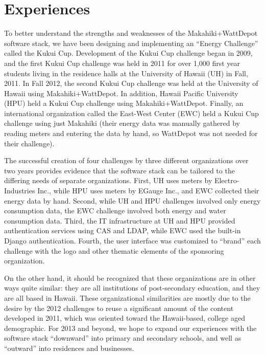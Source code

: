 \newpage
\section{Experiences}

To better understand the strengths and weaknesses of the Makahiki+WattDepot software stack, we have been designing and implementing an ``Energy Challenge'' called the Kukui Cup.  Development of the Kukui Cup challenge began in 2009, and the first Kukui Cup challenge was held in 2011 for over 1,000 first year students living in the residence halls at the University of Hawaii (UH) in Fall, 2011.  In Fall 2012, the second Kukui Cup challenge was held at the University of Hawaii using Makahiki+WattDepot.  In addition, Hawaii Pacific University (HPU) held a Kukui Cup challenge using Makahiki+WattDepot. Finally, an international organization called the East-West Center (EWC) held a Kukui Cup challenge using just Makahiki (their energy data was manually gathered by reading meters and entering the data by hand, so WattDepot was not needed for their challenge).    

The successful creation of four challenges by three different organizations over two years provides evidence that the software stack can be tailored to the differing needs of separate organizations.  First, UH uses meters by Electro-Industries Inc., while HPU uses meters by EGauge Inc., and EWC collected their energy data by hand. Second, while UH and HPU challenges involved only energy consumption data, the EWC challenge involved both energy and water consumption data.  Third, the IT infrastructure at UH and HPU provided authentication services using CAS and LDAP, while EWC used the built-in Django authentication. Fourth, the user interface was customized to ``brand'' each challenge with the logo and other thematic elements of the sponsoring organization. 

On the other hand, it should be recognized that these organizations are in other ways quite similar: they are all institutions of post-secondary education, and they are all based in Hawaii.  These organizational similarities are mostly due to the desire by the 2012 challenges to reuse a significant amount of the content developed in 2011, which was oriented toward the Hawaii-based, college aged demographic. For 2013 and beyond, we hope to expand our experiences with the software stack  ``downward'' into primary and secondary schools, and well as ``outward'' into residences and businesses. 

